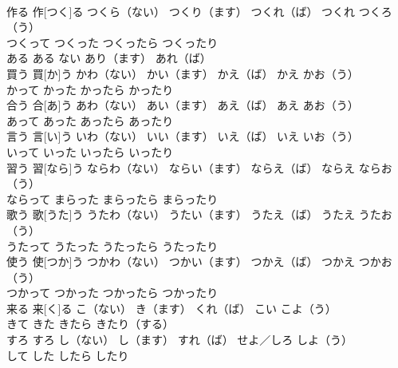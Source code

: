 \documentclass[8pt]{extreport}
\begin{document}
\begin{CJK}{UTF8}{min}
\\	作る	作[つく]る	つくら（ない）	つくり（ます）	つくれ（ば）	つくれ	つくろ（う）	
\\	つくって	つくった	つくったら	つくったり
\\	ある	ある	ない	あり（ます）	あれ（ば）			
\\	買う	買[か]う	かわ（ない）	かい（ます）	かえ（ば）	かえ	かお（う）	
\\	かって	かった	かったら	かったり
\\	合う	合[あ]う	あわ（ない）	あい（ます）	あえ（ば）	あえ	あお（う）	
\\	あって	あった	あったら	あったり
\\	言う	言[い]う	いわ（ない）	いい（ます）	いえ（ば）	いえ	いお（う）	
\\	いって	いった	いったら	いったり
\\	習う	習[なら]う	ならわ（ない）	ならい（ます）	ならえ（ば）	ならえ	ならお（う）	
\\	ならって	まらった	まらったら	まらったり
\\	歌う	歌[うた]う	うたわ（ない）	うたい（ます）	うたえ（ば）	うたえ	うたお（う）	
\\	うたって	うたった	うたったら	うたったり
\\	使う	使[つか]う	つかわ（ない）	つかい（ます）	つかえ（ば）	つかえ	つかお（う）	
\\	つかって	つかった	つかったら	つかったり
\\	来る	来[く]る	こ（ない）	き（ます）	くれ（ば）	こい	こよ（う）	
\\	きて	きた	きたら	きたり（する）
\\	すろ	すろ	し（ない）	し（ます）	すれ（ば）	せよ／しろ	しよ（う）	
\\	して	した	したら	したり
\end{CJK}
\end{document}
